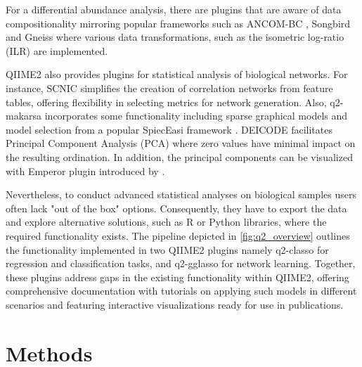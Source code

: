 \documentclass[10pt,a4paper]{article}
\let\cite\citep
\begin{document}
\par For a differential abundance analysis, there are plugins that are aware of data compositionality \cite{aitchison1982statistical} mirroring popular frameworks such as ANCOM-BC \cite{lin2020analysis}, Songbird \cite{morton2019establishing} and Gneiss \cite{morton2017balance} where various data transformations, such as the isometric log-ratio (ILR) are implemented.

\par QIIME2 also provides plugins for statistical analysis of biological networks. For instance, SCNIC \cite{shaffer2023scnic} simplifies the creation of correlation networks from feature tables, offering flexibility in selecting metrics for network generation. Also, q2-makarsa incorporates some functionality including sparse graphical models and model selection from a popular SpiecEasi framework \cite{kurtz2015sparse}. DEICODE \cite{martino2019novel} facilitates Principal Component Analysis (PCA) where zero values have minimal impact on the resulting ordination. In addition, the principal components can be visualized with Emperor plugin introduced by \cite{vazquez2017bringing}.


Nevertheless, to conduct advanced statistical analyses on biological samples users often lack "out of the box" options. Consequently, they have to export the data and explore alternative solutions, such as R or Python libraries, where the required functionality exists. The pipeline depicted in   \autoref{fig:q2_overview} outlines the functionality implemented in two QIIME2 plugins namely q2-classo for regression and classification tasks, and q2-gglasso for network learning. Together, these plugins address gaps in the existing functionality within QIIME2, offering comprehensive documentation with tutorials on applying such models in different scenarios and featuring interactive visualizations ready for use in publications.




\section*{Methods}
\end{document}
